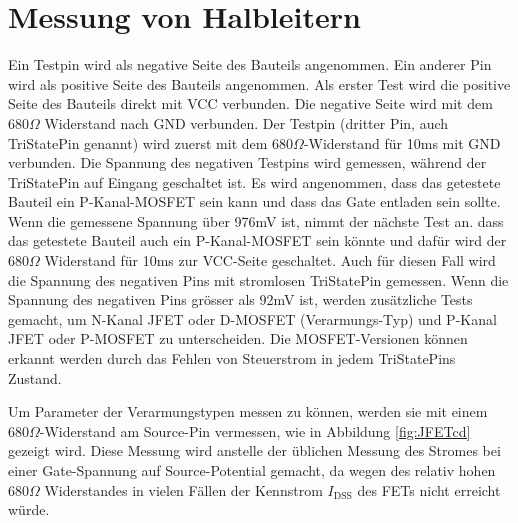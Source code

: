 \section{Messung von Halbleitern}
Ein Testpin wird als negative Seite des Bauteils angenommen.
Ein anderer Pin wird als positive Seite des Bauteils angenommen.
Als erster Test wird die positive Seite des Bauteils direkt mit VCC verbunden.
Die negative Seite wird mit dem \(680\Omega\) Widerstand nach GND verbunden.
Der Testpin (dritter Pin, auch TriStatePin genannt) wird zuerst mit dem \(680\Omega\)-Widerstand
für 10ms mit GND verbunden.
Die Spannung des negativen Testpins wird gemessen, während der TriStatePin auf Eingang
geschaltet ist.
Es wird angenommen, dass das getestete Bauteil ein P-Kanal-MOSFET sein kann und dass das Gate
entladen sein sollte.
Wenn die gemessene Spannung über 976mV ist, nimmt der nächste Test an. dass das getestete
Bauteil auch ein P-Kanal-MOSFET sein könnte und dafür wird der \(680\Omega\) Widerstand
für 10ms zur VCC-Seite geschaltet.
Auch für diesen Fall wird die Spannung des negativen Pins mit stromlosen TriStatePin gemessen.
Wenn die Spannung des negativen Pins grösser als 92mV ist, werden zusätzliche Tests gemacht, 
um N-Kanal JFET oder D-MOSFET (Verarmungs-Typ) und P-Kanal JFET oder P-MOSFET zu unterscheiden.
Die MOSFET-Versionen können erkannt werden durch das Fehlen von Steuerstrom in jedem 
TriStatePins Zustand.

Um Parameter der Verarmungstypen messen zu können, werden sie mit einem \(680 \Omega\)-Widerstand am
Source-Pin vermessen, wie in Abbildung \ref{fig:JFETcd} gezeigt wird. Diese Messung wird anstelle der
üblichen Messung des Stromes bei einer Gate-Spannung auf Source-Potential gemacht, da wegen des
relativ hohen \(680 \Omega\) Widerstandes in vielen Fällen der Kennstrom \(I_\mathrm{DSS}\) 
des FETs nicht erreicht würde.

